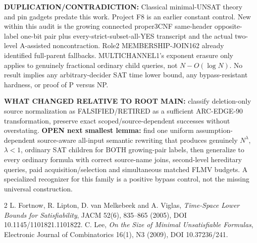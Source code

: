 \documentclass[11pt]{article}
\begin{document}
\textbf{DUPLICATION/CONTRADICTION:} Classical minimal-UNSAT theory and pin gadgets predate this work. Project F8 is an earlier constant control. New within this audit is the growing connected proper3CNF same-header opposite-label one-bit pair plus every-strict-subset-all-YES transcript and the actual two-level A-assisted noncontraction. Role2 MEMBERSHIP-JOIN162 already identified full-parent fallbacks. MULTICHANNEL1's exponent erasure only applies to genuinely fractional ordinary child queries, not $N-O(\log N)$. No result implies any arbitrary-decider SAT time lower bound, any bypass-resistant hardness, or proof of P versus NP.

\textbf{WHAT CHANGED RELATIVE TO ROOT MAIN:} classify deletion-only source normalization as FALSIFIED/RETIRED as a sufficient ARC-EDGE-90 transformation, preserve exact scoped/source-dependent successes without overstating. \textbf{OPEN next smallest lemma:} find one uniform assumption-dependent source-aware all-input semantic rewriting that produces genuinely $N^\lambda$, $\lambda<1$, ordinary SAT children for BOTH growing-pair labels, then generalize to every ordinary formula with correct source-name joins, second-level hereditary queries, paid acquisition/selection and simultaneous matched FLMV budgets. A specialized recognizer for this family is a positive bypass control, not the missing universal construction.
\begin{thebibliography}{2}
 L. Fortnow, R. Lipton, D. van Melkebeek and A. Viglas, \emph{Time-Space Lower Bounds for Satisfiability}, JACM 52(6), 835--865 (2005), DOI 10.1145/1101821.1101822.
 C. Lee, \emph{On the Size of Minimal Unsatisfiable Formulas}, Electronic Journal of Combinatorics 16(1), N3 (2009), DOI 10.37236/241.
\end{thebibliography}
\end{document}
